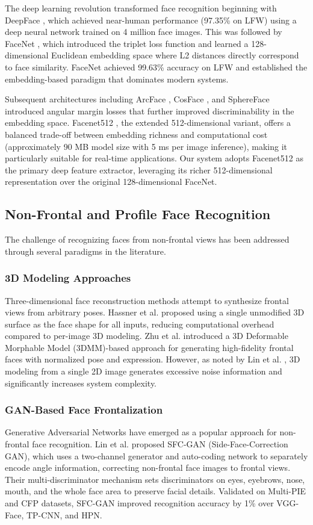 \documentclass[conference]{IEEEtran}
\begin{document}
The deep learning revolution transformed face recognition beginning with DeepFace \cite{b10}, which achieved near-human performance (97.35\% on LFW) using a deep neural network trained on 4 million face images. This was followed by FaceNet \cite{b11}, which introduced the triplet loss function and learned a 128-dimensional Euclidean embedding space where L2 distances directly correspond to face similarity. FaceNet achieved 99.63\% accuracy on LFW and established the embedding-based paradigm that dominates modern systems.

Subsequent architectures including ArcFace \cite{b12}, CosFace \cite{b13}, and SphereFace \cite{b14} introduced angular margin losses that further improved discriminability in the embedding space. Facenet512 \cite{b11}, the extended 512-dimensional variant, offers a balanced trade-off between embedding richness and computational cost (approximately 90 MB model size with 5 ms per image inference), making it particularly suitable for real-time applications. Our system adopts Facenet512 as the primary deep feature extractor, leveraging its richer 512-dimensional representation over the original 128-dimensional FaceNet.

\subsection{Non-Frontal and Profile Face Recognition}

The challenge of recognizing faces from non-frontal views has been addressed through several paradigms in the literature.

\subsubsection{3D Modeling Approaches}
Three-dimensional face reconstruction methods attempt to synthesize frontal views from arbitrary poses. Hassner et al. \cite{b5} proposed using a single unmodified 3D surface as the face shape for all inputs, reducing computational overhead compared to per-image 3D modeling. Zhu et al. \cite{b15} introduced a 3D Deformable Morphable Model (3DMM)-based approach for generating high-fidelity frontal faces with normalized pose and expression. However, as noted by Lin et al. \cite{b3}, 3D modeling from a single 2D image generates excessive noise information and significantly increases system complexity.

\subsubsection{GAN-Based Face Frontalization}
Generative Adversarial Networks have emerged as a popular approach for non-frontal face recognition. Lin et al. \cite{b3} proposed SFC-GAN (Side-Face-Correction GAN), which uses a two-channel generator and auto-coding network to separately encode angle information, correcting non-frontal face images to frontal views. Their multi-discriminator mechanism sets discriminators on eyes, eyebrows, nose, mouth, and the whole face area to preserve facial details. Validated on Multi-PIE and CFP datasets, SFC-GAN improved recognition accuracy by 1\% over VGG-Face, TP-CNN, and HPN.
\end{document}
